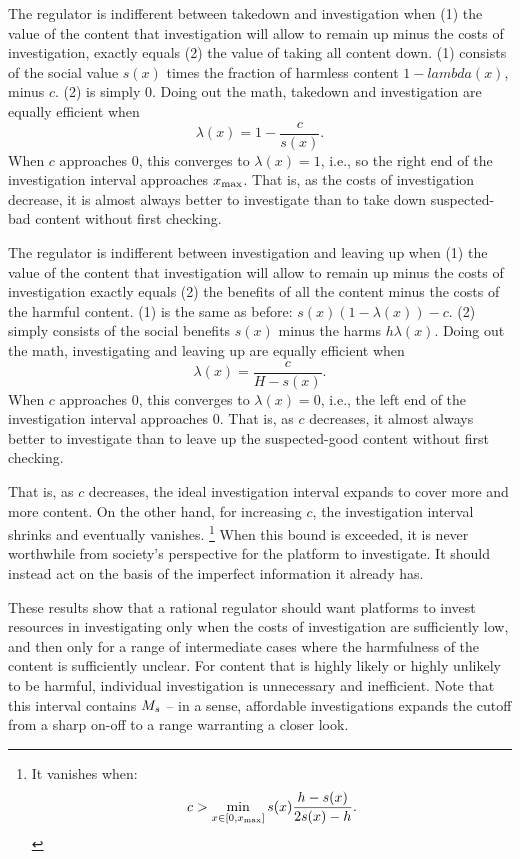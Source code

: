 
The regulator is indifferent between takedown and investigation when (1) the value of the content that investigation will allow to remain up minus the costs of investigation, exactly equals (2) the value of taking all content down. (1) consists of the social value $s(x)$ times the fraction of harmless content $1 - lambda(x)$,  minus $c$. (2) is simply $0$. Doing out the math, takedown and investigation are equally efficient when 
 \begin{equation*}\lambda(x) = 1 - \frac{c}{s(x)}.\end{equation*} When $c$ approaches $0$, this converges to $\lambda(x) = 1$, i.e., so the right end of the investigation interval approaches $x_{\text{max}}$. That is, as the costs of investigation decrease, it is almost always better to investigate than to take down suspected-bad content without first checking.

The regulator is indifferent between investigation and leaving up when (1) the value of the content that investigation will allow to remain up minus the costs of investigation exactly equals (2) the benefits of all the content minus the costs of the harmful content. (1) is the same as before: $s(x)(1 - \lambda(x)) - c$. (2) simply consists of the social benefits $s(x)$ minus the harms $h\lambda(x)$. Doing out the math, investigating and leaving up are equally efficient when 
\begin{equation*}\lambda(x) = \frac{c}{H - s(x)}.\end{equation*} When $c$ approaches $0$, this converges to $\lambda(x) = 0$, i.e., the left end of the investigation interval approaches $0$. That is, as $c$ decreases, it almost always better to investigate than to leave up the suspected-good content without first checking. 

That is, as $c$ decreases, the ideal investigation interval expands to cover more and more content. On the other hand, for increasing $c$, the investigation interval shrinks and eventually vanishes. \footnote{It vanishes when:
\begin{equation*}
c > \min_{x \in [0, x_{\text{max}}]} s(x)\frac{h - s(x)}{2s(x) - h}.
\end{equation*}}
When this bound is exceeded, it is never worthwhile from society's perspective for the platform to investigate. It should instead act on the basis of the imperfect information it already has.

These results show that a rational regulator should want platforms to invest resources in investigating only when the costs of investigation are sufficiently low, and then only for a range of intermediate cases where the harmfulness of the content is sufficiently unclear. For content that is highly likely or highly unlikely to be harmful, individual investigation is unnecessary and inefficient. Note that this interval contains $M_s$ -- in a sense, affordable investigations expands the cutoff from a sharp on-off to a range warranting a closer look.

